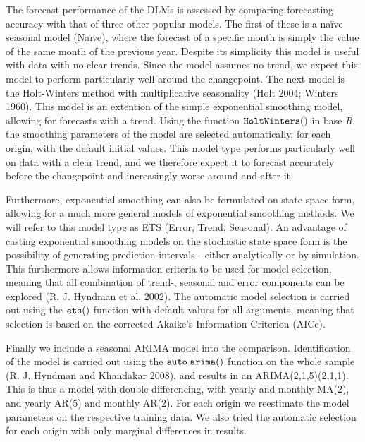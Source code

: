\documentclass[]{article}
\begin{document}
The forecast performance of the DLMs is assessed by comparing
forecasting accuracy with that of three other popular models. The first
of these is a naïve seasonal model (Naïve), where the forecast of a
specific month is simply the value of the same month of the previous
year. Despite its simplicity this model is useful with data with no
clear trends. Since the model assumes no trend, we expect this model to
perform particularly well around the changepoint. The next model is the
Holt-Winters method with multiplicative seasonality (Holt 2004; Winters
1960). This model is an extention of the simple exponential smoothing
model, allowing for forecasts with a trend. Using the function
\({\tt HoltWinters()}\) in base \emph{R}, the smoothing parameters of
the model are selected automatically, for each origin, with the default
initial values. This model type performs particularly well on data with
a clear trend, and we therefore expect it to forecast accurately before
the changepoint and increasingly worse around and after it.

Furthermore, exponential smoothing can also be formulated on state space
form, allowing for a much more general models of exponential smoothing
methods. We will refer to this model type as ETS (Error, Trend,
Seasonal). An advantage of casting exponential smoothing models on the
stochastic state space form is the possibility of generating prediction
intervals - either analytically or by simulation. This furthermore
allows information criteria to be used for model selection, meaning that
all combination of trend-, seasonal and error components can be explored
(R. J. Hyndman et al. 2002). The automatic model selection is carried
out using the \({\tt ets()}\) function with default values for all
arguments, meaning that selection is based on the corrected Akaike's
Information Criterion (AICc).

Finally we include a seasonal ARIMA model into the comparison.
Identification of the model is carried out using the
\({\tt auto.arima()}\) function on the whole sample (R. J. Hyndman and
Khandakar 2008), and results in an ARIMA(2,1,5)(2,1,1). This is thus a
model with double differencing, with yearly and monthly MA(2), and
yearly AR(5) and monthly AR(2). For each origin we reestimate the model
parameters on the respective training data. We also tried the automatic
selection for each origin with only marginal differences in results.
\end{document}

